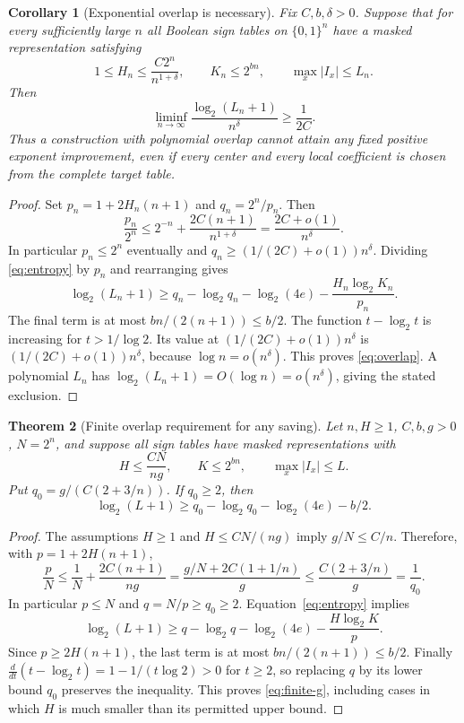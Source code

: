 \documentclass[11pt]{article}
\newtheorem{theorem}{Theorem}
\newtheorem{corollary}[theorem]{Corollary}
\newcommand{\Qn}{\{0,1\}^n}
\begin{document}
\begin{corollary}[Exponential overlap is necessary]\label{cor:overlap}
Fix $C,b,\delta>0$. Suppose that for every sufficiently large $n$ all
Boolean sign tables on $\Qn$ have a masked representation satisfying
\[
 1\leq H_n\leq\frac{C2^n}{n^{1+\delta}},
 \qquad K_n\leq2^{bn},
 \qquad \max_x|I_x|\leq L_n.
\]
Then
\[
 \liminf_{n\to\infty}
 \frac{\log_2(L_n+1)}{n^\delta}\geq\frac1{2C}.
 \tag{3}\label{eq:overlap}
\]
Thus a construction with polynomial overlap cannot attain any fixed
positive exponent improvement, even if every center and every local
coefficient is chosen from the complete target table.
\end{corollary}
\begin{proof}
Set $p_n=1+2H_n(n+1)$ and $q_n=2^n/p_n$. Then
\[
 \frac{p_n}{2^n}\leq2^{-n}+
 \frac{2C(n+1)}{n^{1+\delta}}
 =\frac{2C+o(1)}{n^\delta}.
\]
In particular $p_n\leq2^n$ eventually and
$q_n\geq(1/(2C)+o(1))n^\delta$. Dividing
\eqref{eq:entropy} by $p_n$ and rearranging gives
\[
 \log_2(L_n+1)\geq q_n-\log_2q_n-\log_2(4e)
                 -\frac{H_n\log_2K_n}{p_n}.
\]
The final term is at most
$bn/(2(n+1))\leq b/2$. The function
$t-\log_2t$ is increasing for $t>1/\log 2$. Its value at
$(1/(2C)+o(1))n^\delta$ is
$(1/(2C)+o(1))n^\delta$, because $\log n=o(n^\delta)$.
This proves \eqref{eq:overlap}. A polynomial $L_n$ has
$\log_2(L_n+1)=O(\log n)=o(n^\delta)$, giving the stated exclusion.
\end{proof}

\begin{theorem}[Finite overlap requirement for any saving]\label{thm:general-g}
Let $n,H\geq1$, $C,b,g>0$, $N=2^n$, and suppose all sign tables
have masked representations with
\[
 H\leq\frac{CN}{ng},\qquad K\leq2^{bn},\qquad
 \max_x|I_x|\leq L.
\]
Put $q_0=g/(C(2+3/n))$. If $q_0\geq2$, then
\[
 \log_2(L+1)\geq
 q_0-\log_2q_0-\log_2(4e)-b/2.
 \tag{4}\label{eq:finite-g}
\]
\end{theorem}
\begin{proof}
The assumptions $H\geq1$ and $H\leq CN/(ng)$ imply $g/N\leq C/n$.
Therefore, with $p=1+2H(n+1)$,
\[
 \frac pN\leq\frac1N+\frac{2C(n+1)}{ng}
 =\frac{g/N+2C(1+1/n)}g
 \leq\frac{C(2+3/n)}g=\frac1{q_0}.
\]
In particular $p\leq N$ and $q=N/p\geq q_0\geq2$.
Equation~\eqref{eq:entropy} implies
\[
 \log_2(L+1)\geq q-\log_2q-\log_2(4e)
                   -\frac{H\log_2K}{p}.
\]
Since $p\geq2H(n+1)$, the last term is at most
$bn/(2(n+1))\leq b/2$. Finally
$\frac{d}{dt}(t-\log_2t)=1-1/(t\log 2)>0$ for $t\geq2$,
so replacing $q$ by its lower bound $q_0$ preserves the inequality.
This proves \eqref{eq:finite-g}, including cases in which $H$ is
much smaller than its permitted upper bound.
\end{proof}
\end{document}
